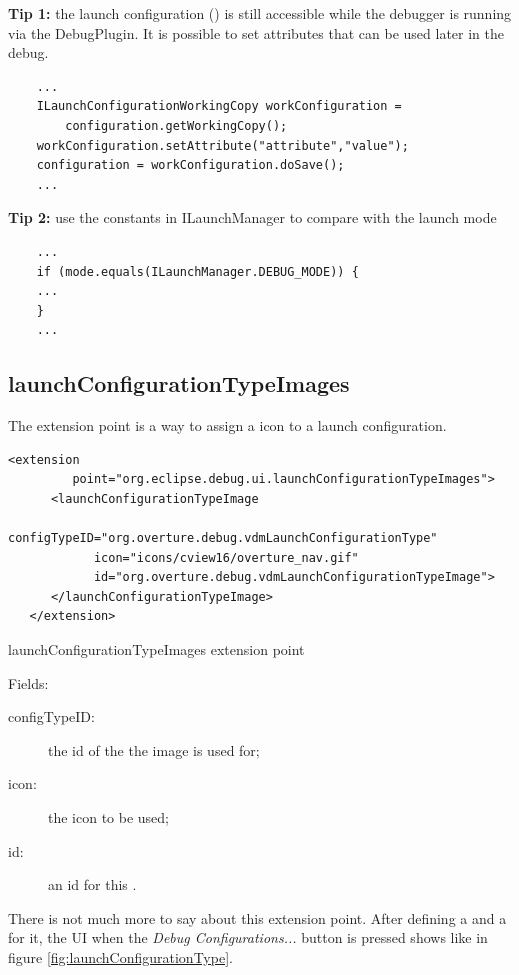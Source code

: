 \textbf{Tip 1:} the launch configuration () is still accessible while the debugger is running via the DebugPlugin. It is possible to set attributes that can be used later in the debug.
\begin{lstlisting}
	...
	ILaunchConfigurationWorkingCopy workConfiguration = 
		configuration.getWorkingCopy();		
	workConfiguration.setAttribute("attribute","value");
	configuration = workConfiguration.doSave();
	...
\end{lstlisting}

\textbf{Tip 2:} use the constants in ILaunchManager to compare with the launch mode
\begin{lstlisting}
	...
	if (mode.equals(ILaunchManager.DEBUG_MODE)) {
	...
	}
	...
\end{lstlisting}



\subsection{launchConfigurationTypeImages}
The  extension point is a way to assign a icon to a launch configuration.

\begin{program}
\scriptsize
\begin{verbatim}
<extension
         point="org.eclipse.debug.ui.launchConfigurationTypeImages">
      <launchConfigurationTypeImage
            configTypeID="org.overture.debug.vdmLaunchConfigurationType"
            icon="icons/cview16/overture_nav.gif"
            id="org.overture.debug.vdmLaunchConfigurationTypeImage">
      </launchConfigurationTypeImage>
   </extension>
\end{verbatim}
\caption{launchConfigurationTypeImages extension point}
\normalsize
\end{program}

Fields:
\begin{description}
\item[configTypeID:] the id of the  the image is used for;
\item[icon:] the icon to be used;
\item[id:] an id for this .
\end{description}

There is not much more to say about this extension point. After defining a  and a   for it, the UI when the \textit{Debug Configurations...} button is pressed shows like in figure \ref{fig:launchConfigurationType}.

